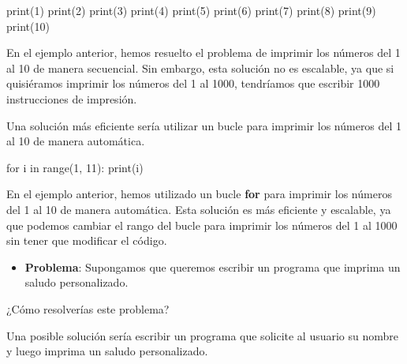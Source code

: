 \documentclass[
  a4paper,
  DIV=11,
  numbers=noendperiod,
  onepage,
  openany]{scrreprt}
\newenvironment{Shaded}{\begin{snugshade}}{\end{snugshade}}
\newcommand{\BuiltInTok}[1]{\textcolor[rgb]{0.00,0.23,0.31}{#1}}
\newcommand{\ControlFlowTok}[1]{\textcolor[rgb]{0.00,0.23,0.31}{#1}}
\newcommand{\DecValTok}[1]{\textcolor[rgb]{0.68,0.00,0.00}{#1}}
\newcommand{\KeywordTok}[1]{\textcolor[rgb]{0.00,0.23,0.31}{#1}}
\newcommand{\NormalTok}[1]{\textcolor[rgb]{0.00,0.23,0.31}{#1}}
\providecommand{\tightlist}{%
  \setlength{\itemsep}{0pt}\setlength{\parskip}{0pt}}\usepackage{longtable,booktabs,array}
\begin{document}
\begin{Shaded}
\begin{Highlighting}[]
\BuiltInTok{print}\NormalTok{(}\DecValTok{1}\NormalTok{)}
\BuiltInTok{print}\NormalTok{(}\DecValTok{2}\NormalTok{)}
\BuiltInTok{print}\NormalTok{(}\DecValTok{3}\NormalTok{)}
\BuiltInTok{print}\NormalTok{(}\DecValTok{4}\NormalTok{)}
\BuiltInTok{print}\NormalTok{(}\DecValTok{5}\NormalTok{)}
\BuiltInTok{print}\NormalTok{(}\DecValTok{6}\NormalTok{)}
\BuiltInTok{print}\NormalTok{(}\DecValTok{7}\NormalTok{)}
\BuiltInTok{print}\NormalTok{(}\DecValTok{8}\NormalTok{)}
\BuiltInTok{print}\NormalTok{(}\DecValTok{9}\NormalTok{)}
\BuiltInTok{print}\NormalTok{(}\DecValTok{10}\NormalTok{)}
\end{Highlighting}
\end{Shaded}

En el ejemplo anterior, hemos resuelto el problema de imprimir los
números del 1 al 10 de manera secuencial. Sin embargo, esta solución no
es escalable, ya que si quisiéramos imprimir los números del 1 al 1000,
tendríamos que escribir 1000 instrucciones de impresión.

Una solución más eficiente sería utilizar un bucle para imprimir los
números del 1 al 10 de manera automática.

\begin{Shaded}
\begin{Highlighting}[]
\ControlFlowTok{for}\NormalTok{ i }\KeywordTok{in} \BuiltInTok{range}\NormalTok{(}\DecValTok{1}\NormalTok{, }\DecValTok{11}\NormalTok{):}
    \BuiltInTok{print}\NormalTok{(i)}
\end{Highlighting}
\end{Shaded}

En el ejemplo anterior, hemos utilizado un bucle \textbf{for} para
imprimir los números del 1 al 10 de manera automática. Esta solución es
más eficiente y escalable, ya que podemos cambiar el rango del bucle
para imprimir los números del 1 al 1000 sin tener que modificar el
código.

\begin{itemize}
\tightlist
\item
  \textbf{Problema}: Supongamos que queremos escribir un programa que
  imprima un saludo personalizado.
\end{itemize}

¿Cómo resolverías este problema?

Una posible solución sería escribir un programa que solicite al usuario
su nombre y luego imprima un saludo personalizado.
\end{document}

